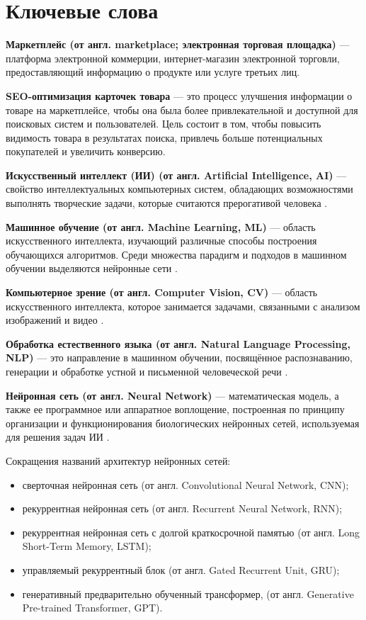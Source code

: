 \documentclass[a4paper,12pt]{extarticle}
\begin{document}
\newpage
\section*{Ключевые слова}   %

\textbf{Маркетплейс (от англ. marketplace; электронная торговая площадка)} — платформа электронной коммерции, интернет-магазин электронной торговли, предоставляющий информацию о продукте или услуге третьих лиц.

\textbf{SEO-оптимизация карточек товара} — это процесс улучшения информации о товаре на маркетплейсе, чтобы она была более привлекательной и доступной для поисковых систем и пользователей. Цель состоит в том, чтобы повысить видимость товара в результатах поиска, привлечь больше потенциальных покупателей и увеличить конверсию.

\textbf{Искусственный интеллект (ИИ) (от англ. Artificial Intelligence, AI)} — свойство интеллектуальных компьютерных систем, обладающих возможностями выполнять творческие задачи, которые считаются прерогативой человека \cite{aiwebsite}.

\textbf{Машинное обучение (от англ. Machine Learning, ML)} — область искусственного интеллекта, изучающий различные способы построения обучающихся алгоритмов. Среди множества парадигм и подходов в машинном обучении выделяются нейронные сети \cite{mlwebsite}. 

\textbf{Компьютерное зрение (от англ. Computer Vision, CV)} — область искусственного интеллекта, которое занимается задачами, связанными с анализом изображений и видео \cite{cvwebsite}.

\textbf{Обработка естественного языка (от англ. Natural Language Processing, NLP)} — это направление в машинном обучении, посвящённое распознаванию, генерации и обработке устной и письменной человеческой речи \cite{nlpwebsite}.

\textbf{Нейронная сеть (от англ. Neural Network)} — математическая модель, а также ее программное или аппаратное воплощение, построенная по принципу организации и функционирования биологических нейронных сетей, используемая для решения задач ИИ \cite{neuralwebsite}.

Сокращения названий архитектур нейронных сетей:
\begin{itemize}
	\item сверточная нейронная сеть (от англ. Convolutional Neural Network, CNN);
	\item рекуррентная нейронная сеть (от англ. Recurrent Neural Network, RNN);
	\item рекуррентная нейронная сеть с долгой краткосрочной памятью (от англ. Long Short-Term Memory, LSTM);
	\item управляемый рекуррентный блок (от англ. Gated Recurrent Unit, GRU);
	\item генеративный предварительно обученный трансформер, (от англ. Generative Pre-trained Transformer, GPT).
\end{itemize}
\end{document}
